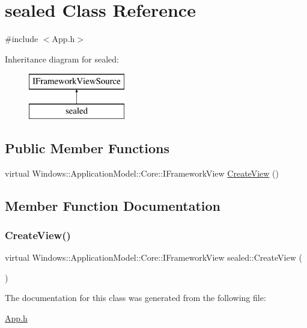 \hypertarget{classsealed}{}\section{sealed Class Reference}
\label{classsealed}


{\ttfamily \#include $<$App.\+h$>$}

Inheritance diagram for sealed\+:\begin{figure}[H]
\begin{center}
\leavevmode
\includegraphics[height=2.000000cm]{classsealed}
\end{center}
\end{figure}
\subsection*{Public Member Functions}
\begin{DoxyCompactItemize}
\item 
virtual Windows\+::\+Application\+Model\+::\+Core\+::\+I\+Framework\+View \hyperlink{classsealed_ab46ae01be339d1457970df0de4f2ab76}{Create\+View} ()
\end{DoxyCompactItemize}


\subsection{Member Function Documentation}
\mbox{\label{classsealed_ab46ae01be339d1457970df0de4f2ab76}} 
\subsubsection{\texorpdfstring{Create\+View()}{CreateView()}}
{\footnotesize\ttfamily virtual Windows\+::\+Application\+Model\+::\+Core\+::\+I\+Framework\+View sealed\+::\+Create\+View (\begin{DoxyParamCaption}{ }\end{DoxyParamCaption})\hspace{0.3cm}{\ttfamily [virtual]}}



The documentation for this class was generated from the following file\+:\begin{DoxyCompactItemize}
\item 
\hyperlink{_app_8h}{App.\+h}\end{DoxyCompactItemize}
